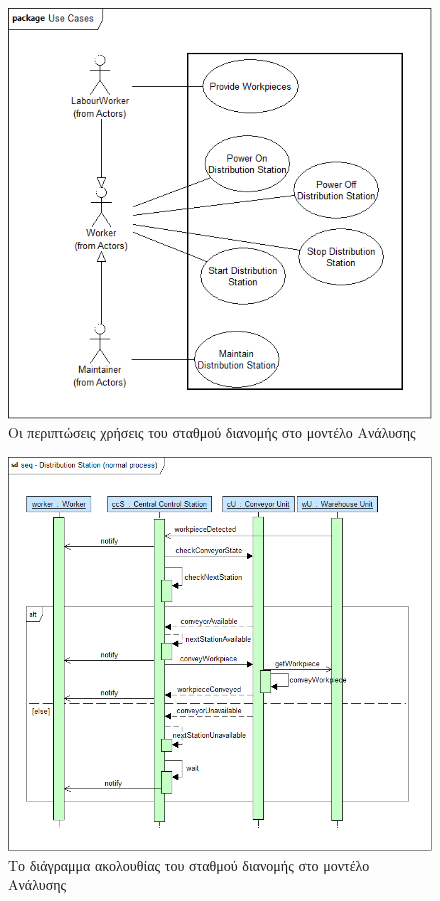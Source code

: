 \documentclass[a4paper,12pt,twoside]{report}
\begin{document}
\begin{appendices}
			\begin{figure}[hp]
					\centering
					\includegraphics[scale=0.30]{AnalysisModel_uc-DistributionStationsUseCases.png}
					\caption{Οι περιπτώσεις χρήσεις του σταθμού διανομής στο μοντέλο Ανάλυσης}
					\label{φωτ:Οι περιπτώσεις χρήσεις του σταθμού διανομής στο μοντέλο Ανάλυσης}
			\end{figure}
			
			\begin{figure}[hp]
					\centering
					\includegraphics[scale=0.30]{AnalysisModel_seq-DistributionStation(normalprocess).png}
					\caption{Το διάγραμμα ακολουθίας του σταθμού διανομής στο μοντέλο Ανάλυσης}
					\label{φωτ:Το διάγραμμα ακολουθίας του σταθμού διανομής στο μοντέλο Ανάλυσης}
			\end{figure}


\end{appendices}
\end{document}
